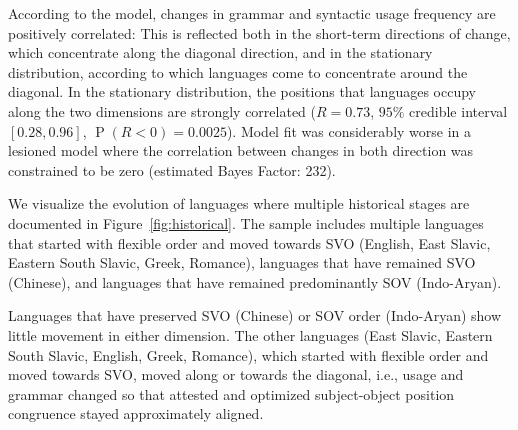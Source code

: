 \documentclass[9pt,twocolumn,twoside,lineno]{pnas-new}
\begin{document}
According to the model, changes in grammar and syntactic usage frequency are positively correlated:
This is reflected both in the short-term directions of change, which concentrate along the diagonal direction, and in the stationary distribution, according to which languages come to concentrate around the diagonal.
In the stationary distribution, the positions that languages occupy along the two dimensions are strongly correlated ($R=0.73$, $95\%$ credible interval $[0.28, 0.96]$, $\operatorname{P}(R<0) = 0.0025$). %
Model fit was considerably worse in a lesioned model where the correlation between changes in both direction was constrained to be zero (estimated Bayes Factor: 232). %





We visualize the evolution of languages where multiple historical stages are documented in Figure~\ref{fig:historical}.
The sample includes multiple languages that started with flexible order and moved towards SVO (English, East Slavic, Eastern South Slavic, Greek, Romance), languages that have remained SVO (Chinese), and languages that have remained predominantly SOV (Indo-Aryan).

Languages that have preserved SVO (Chinese) or SOV order (Indo-Aryan) show little movement in either dimension.
The other languages (East Slavic, Eastern South Slavic, English, Greek, Romance), which started with flexible order and moved towards SVO, moved along or towards the diagonal, i.e., usage and grammar changed so that attested and optimized subject-object position congruence stayed approximately aligned.
\end{document}
